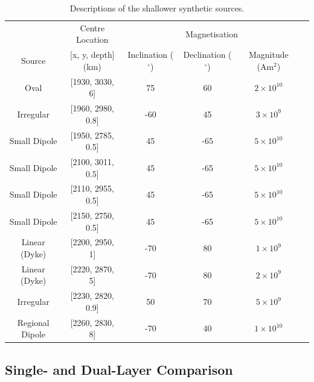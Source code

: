 \begin{table}[tb!]
\centering
\begin{tabular}{c c c c c c}
\toprule
 & Centre Location & \multicolumn{3}{c}{Magnetisation} \\
\cmidrule(lr){2-2} \cmidrule(lr){3-5}
Source & [x, y, depth] (km) & Inclination ($^\circ$) & Declination ($^\circ$) & Magnitude (Am$^2$) \\
\midrule
Oval & [1930, 3030, 6] & 75 & 60 & $2 \times 10^{10}$ \\
Irregular & [1960, 2980, 0.8] & -60 & 45 & $3 \times 10^{9}$ \\
Small Dipole & [1950, 2785, 0.5] & 45 & -65 & $5 \times 10^{10}$ \\
Small Dipole	& [2100, 3011, 0.5] & 45 & -65 & $5 \times 10^{10}$ \\
Small Dipole & [2110, 2955, 0.5] & 45 & -65 & $5 \times 10^{10}$ \\
Small Dipole & [2150, 2750, 0.5] & 45 & -65 & $5 \times 10^{10}$ \\
Linear (Dyke) & [2200, 2950, 1] & -70 & 80 & $1 \times 10^{9}$ \\
Linear (Dyke) & [2220, 2870, 5] & -70 & 80 & $2 \times 10^{9}$ \\
Irregular & [2230, 2820, 0.9] & 50 & 70 & $5 \times 10^{9}$ \\
Regional Dipole & [2260, 2830, 8] & -70 & 40 & $1 \times 10^{10}$ \\
\bottomrule
\end{tabular}
\caption{Descriptions of the shallower synthetic sources.}
\label{table:shallow_sources}
\end{table}

\subsection{Single- and Dual-Layer Comparison}
\label{sec:single_vs_dual}

